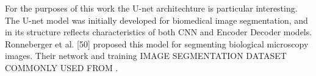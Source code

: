 For the purposes of this work the U-net architechture is particular interesting. The U-net model was initially developed for biomedical image segmentation, and in its structure reflects characteristics of both CNN and Encoder Decoder models. Ronneberger et al. [50] proposed this model for segmenting biological microscopy images. Their network and training
%
%
%
%
IMAGE SEGMENTATION DATASET COMMONLY USED FROM \cite{deep_seg_SOA}.
